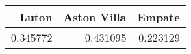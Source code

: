 \begin{tabular}{rrr}
\hline
    Luton &   Aston Villa &   Empate \\
\hline
 0.345772 &      0.431095 & 0.223129 \\
\hline
\end{tabular}